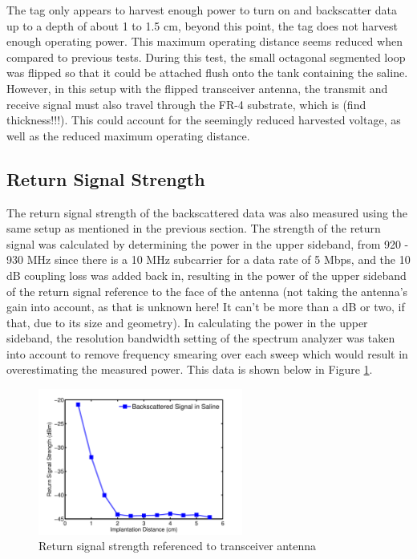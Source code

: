 \documentclass[12pt,onecolumn,titlepage]{article}
\begin{document}
The tag only appears to harvest enough power to turn on and backscatter data up to a depth of about 1 to 1.5 cm, beyond this point, the tag does not harvest enough operating power. This maximum operating distance seems reduced when compared to previous tests. During this test, the small octagonal segmented loop was flipped so that it could be attached flush onto the tank containing the saline. However, in this setup with the flipped transceiver antenna, the transmit and receive signal must also travel through the FR-4 substrate, which is (find thickness!!!). This could account for the seemingly reduced harvested voltage, as well as the reduced maximum operating distance.

\subsection{Return Signal Strength}
\indent \indent The return signal strength of the backscattered data was also measured using the same setup as mentioned in the previous section. The strength of the return signal was calculated by determining the power in the upper sideband, from 920 - 930 MHz since there is a 10 MHz subcarrier for a data rate of 5 Mbps, and the 10 dB coupling loss was added back in, resulting in the power of the upper sideband of the return signal reference to the face of the antenna (not taking the antenna's gain into account, as that is unknown here! It can't be more than a dB or two, if that, due to its size and geometry). In calculating the power in the upper sideband, the resolution bandwidth setting of the spectrum analyzer was taken into account to remove frequency smearing over each sweep which would result in overestimating the measured power. This data is shown below in Figure \ref{fig:return_signal_strength_small_oct_loop_retune}.

\begin{figure}[h]
	\centering
	\includegraphics[width=0.6\textwidth]{Pictures/19Feb2013/return_signal_strength_small_oct_loop_retune}
	\caption{Return signal strength referenced to transceiver antenna}
	\label{fig:return_signal_strength_small_oct_loop_retune}
\end{figure}
\end{document}
